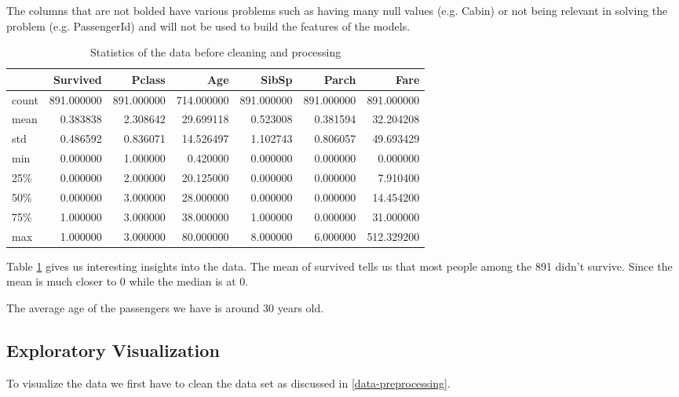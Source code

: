 \documentclass{article}
\begin{document}
The columns that are not bolded have various problems such as having many 
null values (e.g. Cabin) or not being relevant in solving the problem
(e.g. PassengerId) and will not be used to build the features of the models.

\begin{table} [H]
    \begin{tabular}{lrrrrrr}
        \hline
        {} &     Survived &      Pclass &         Age &       SibSp &       Parch &        Fare \\
        \hline
        count &   891.000000 &  891.000000 &  714.000000 &  891.000000 &  891.000000 &  891.000000 \\
        mean  &    0.383838 &    2.308642 &   29.699118 &    0.523008 &    0.381594 &   32.204208 \\
        std   &    0.486592 &    0.836071 &   14.526497 &    1.102743 &    0.806057 &   49.693429 \\
        min   &    0.000000 &    1.000000 &    0.420000 &    0.000000 &    0.000000 &    0.000000 \\
        25\%  &    0.000000 &    2.000000 &   20.125000 &    0.000000 &    0.000000 &    7.910400 \\
        50\%  &    0.000000 &    3.000000 &   28.000000 &    0.000000 &    0.000000 &   14.454200 \\
        75\%  &    1.000000 &    3.000000 &   38.000000 &    1.000000 &    0.000000 &   31.000000 \\
        max   &    1.000000 &    3.000000 &   80.000000 &    8.000000 &    6.000000 &  512.329200 \\
        \hline
    \end{tabular}
    \caption{\label{tab:data-stats}Statistics of the data before cleaning and processing}
\end{table}

Table \ref{tab:data-stats} gives us interesting insights into the data. The mean of survived
tells us that most people among the 891 didn't survive. Since the mean is much closer
to 0 while the median is at 0.

The average age of the passengers we have is around 30 years old.

\subsection{Exploratory
Visualization}\label{exploratory-visualization}

To visualize the data we first have to clean the data set as discussed in \ref{data-preprocessing}.
\end{document}
